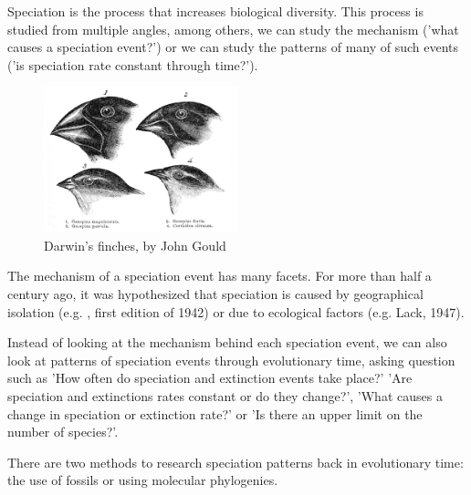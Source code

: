 Speciation is the process that increases biological diversity.
This process is studied from multiple angles, among others,
we can study the mechanism ('what
causes a speciation event?') or we can study the patterns of many
of such events ('is speciation rate constant through time?').

\begin{figure}[H]
  \includegraphics[width=0.5\textwidth]{Darwin's_finches_by_Gould.jpg}
  \caption{
    Darwin's finches, by John Gould
  }
\end{figure}

The mechanism of a speciation event has many facets.
For more than half a century ago, it was hypothesized
that speciation is caused by geographical 
isolation (e.g. \cite{mayr1999systematics}, first edition of 1942)
or due to ecological factors (e.g. Lack, 1947).

Instead of looking at the mechanism behind each speciation event,
we can also look at patterns of speciation events through evolutionary time,
asking question such as 'How often do speciation and extinction events take place?'
'Are speciation and extinctions rates constant or do they change?',
'What causes a change in speciation or extinction rate?' or
'Is there an upper limit on the number of species?'.

There are two methods to research speciation patterns back in evolutionary time:
the use of fossils or using molecular phylogenies.

